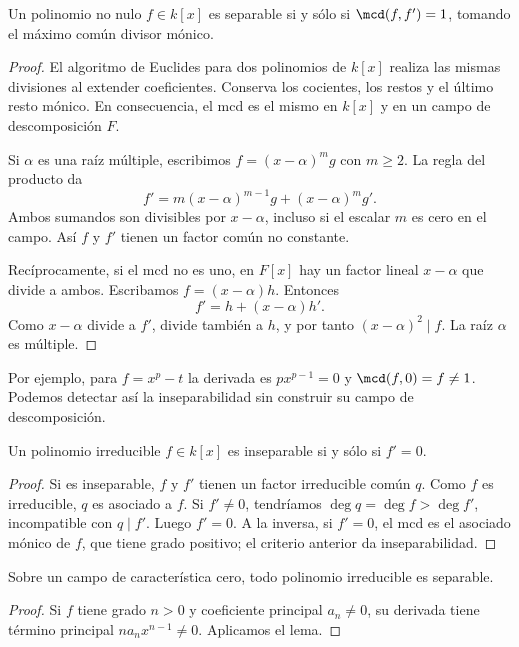 \begin{lema}\label{lema:C25-derivada}
Un polinomio no nulo $f\in k[x]$ es separable si y sólo si $\mcd(f,f')=1$, tomando el máximo común divisor mónico.
\end{lema}
\begin{proof}
El algoritmo de Euclides para dos polinomios de $k[x]$ realiza las mismas divisiones al extender coeficientes. Conserva los cocientes, los restos y el último resto mónico. En consecuencia, el mcd es el mismo en $k[x]$ y en un campo de descomposición $F$.

Si $\alpha$ es una raíz múltiple, escribimos $f=(x-\alpha)^m g$ con $m\geq2$. La regla del producto da
\[
f'=m(x-\alpha)^{m-1}g+(x-\alpha)^m g'.
\]
Ambos sumandos son divisibles por $x-\alpha$, incluso si el escalar $m$ es cero en el campo. Así $f$ y $f'$ tienen un factor común no constante.

Recíprocamente, si el mcd no es uno, en $F[x]$ hay un factor lineal $x-\alpha$ que divide a ambos. Escribamos $f=(x-\alpha)h$. Entonces
\[
f'=h+(x-\alpha)h'.
\]
Como $x-\alpha$ divide a $f'$, divide también a $h$, y por tanto $(x-\alpha)^2\mid f$. La raíz $\alpha$ es múltiple.
\end{proof}
Por ejemplo, para $f=x^p-t$ la derivada es $px^{p-1}=0$ y $\mcd(f,0)=f\ne1$. Podemos detectar así la inseparabilidad sin construir su campo de descomposición.

\begin{lema}\label{lema:C25-irred-derivada}
Un polinomio irreducible $f\in k[x]$ es inseparable si y sólo si $f'=0$.
\end{lema}
\begin{proof}
Si es inseparable, $f$ y $f'$ tienen un factor irreducible común $q$. Como $f$ es irreducible, $q$ es asociado a $f$. Si $f'\ne0$, tendríamos $\deg q=\deg f>\deg f'$, incompatible con $q\mid f'$. Luego $f'=0$. A la inversa, si $f'=0$, el mcd es el asociado mónico de $f$, que tiene grado positivo; el criterio anterior da inseparabilidad.
\end{proof}

\begin{coro}\label{coro:C25-caracteristica-cero}
Sobre un campo de característica cero, todo polinomio irreducible es separable.
\end{coro}
\begin{proof}
Si $f$ tiene grado $n>0$ y coeficiente principal $a_n\ne0$, su derivada tiene término principal $na_nx^{n-1}\ne0$. Aplicamos el lema.
\end{proof}

